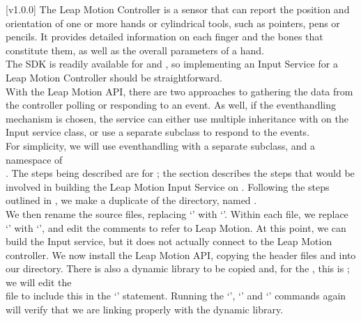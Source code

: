 [v1.0.0]
The Leap Motion Controller is a sensor that can report the position and orientation of one
or more hands or cylindrical tools, such as pointers, pens or pencils.
It provides detailed information on each finger and the bones that constitute them, as
well as the overall parameters of a hand.\\

The SDK \textbraceleft{}\textbraceright{} is readily available for \win{} and \osx, so
implementing an Input Service for a Leap Motion Controller should be straightforward.\\

With the Leap Motion API, there are two approaches to gathering the data from the
controller \longDash{} polling or responding to an event.
As well, if the event\longDash{}handling mechanism is chosen, the service can either use
multiple inheritance with  on the Input service class, or use a
separate  subclass to respond to the events.\\

For simplicity, we will use event\longDash{}handling with a separate
 subclass, and a namespace of\\
.
The steps being described are for \osx; the section
 describes the steps that would be
involved in building the Leap Motion Input Service on \win.
Following the steps outlined in ,
we make a duplicate of the  directory, named .\\

We then rename the source files, replacing `' with `'. 
\tertiaryEnd
{}
Within each file, we replace `' with `', and edit the
comments to refer to Leap Motion.
At this point, we can build the Input service, but it does not actually connect to the
Leap Motion controller.
\tertiaryEnd
{}
We now install the Leap Motion API, copying the header files  and
 into our directory.
There is also a dynamic library to be copied and, for the \osx, this is
; we will edit the\\
 file to include this in the
`' statement.
Running the `', `' and `'
commands again will verify that we are linking properly with the dynamic library.\\


